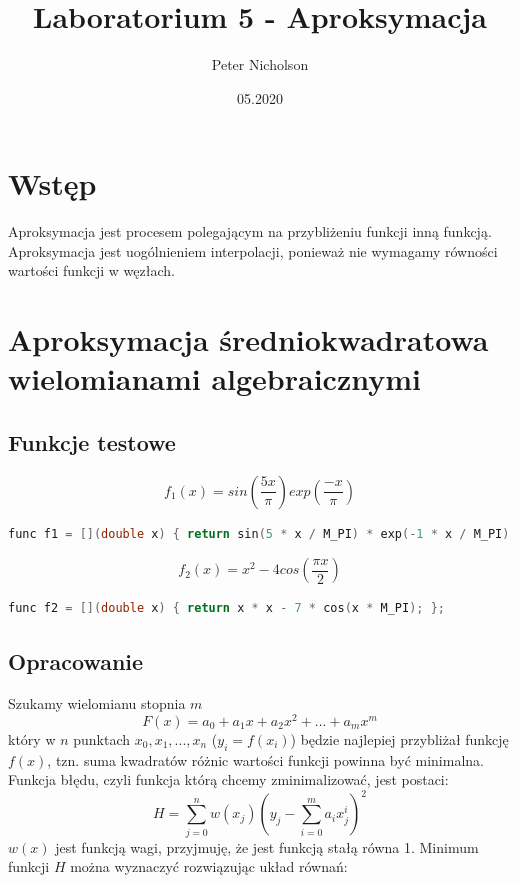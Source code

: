 \documentclass{article}
\title{Laboratorium 5 - Aproksymacja}
\author{Peter Nicholson}
\date{05.2020}
\begin{document}
\maketitle

\section{Wstęp}
Aproksymacja jest procesem polegającym na przybliżeniu funkcji inną funkcją. Aproksymacja jest uogólnieniem interpolacji, ponieważ nie wymagamy równości wartości funkcji w węzłach.

\section{Aproksymacja średniokwadratowa wielomianami algebraicznymi}

\subsection{Funkcje testowe}

\[f_1(x)=sin(\frac{5x}{\pi})exp(\frac{-x}{\pi})\]
\begin{lstlisting}[language=C++]
func f1 = [](double x) { return sin(5 * x / M_PI) * exp(-1 * x / M_PI); };
\end{lstlisting}

\[f_2(x)=x^2 - 4cos(\frac{\pi x}{2})\]
\begin{lstlisting}[language=C++]
func f2 = [](double x) { return x * x - 7 * cos(x * M_PI); };
\end{lstlisting}

\subsection{Opracowanie}

Szukamy wielomianu stopnia \(m\)
\[F(x) = a_0 + a_1 x + a_2 x^2 + ... + a_m x^m\]
który w \(n\) punktach \(x_0, x_1, ..., x_n\) (\(y_i = f(x_i)\)) będzie najlepiej przybliżał funkcję \(f(x)\), tzn. suma kwadratów różnic wartości funkcji powinna być minimalna. Funkcja błędu, czyli funkcja którą chcemy zminimalizować, jest postaci:
\[H = \sum\limits_{j=0}^n w(x_j) (y_j - \sum\limits_{i=0}^m a_i x_j^i)^2\]
\(w(x)\) jest funkcją wagi, przyjmuję, że jest funkcją stałą równa 1. Minimum funkcji \(H\) można wyznaczyć rozwiązując układ równań:
\end{document}
